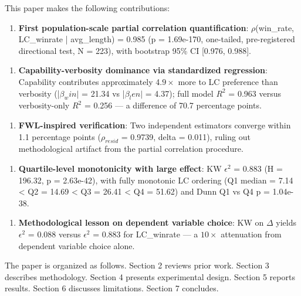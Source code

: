 This paper makes the following contributions:

\begin{enumerate}
\item \textbf{First population-scale partial correlation quantification}: $\rho$(win\_rate, LC\_winrate | avg\_length) = 0.985 (p = 1.69e-170, one-tailed, pre-registered directional test, N = 223), with bootstrap 95\% CI [0.976, 0.988].
\end{enumerate}

\begin{enumerate}
\item \textbf{Capability-verbosity dominance via standardized regression}: Capability contributes approximately 4.$9\times$ more to LC preference than verbosity (|$\beta _win|$ = 21.34 vs |$\beta _len|$ = 4.37); full model $R^2$ = 0.963 versus verbosity-only $R^2$ = 0.256 --- a difference of 70.7 percentage points.
\end{enumerate}

\begin{enumerate}
\item \textbf{FWL-inspired verification}: Two independent estimators converge within 1.1 percentage points ($\rho_{resid}$ = 0.9739, delta = 0.011), ruling out methodological artifact from the partial correlation procedure.
\end{enumerate}

\begin{enumerate}
\item \textbf{Quartile-level monotonicity with large effect}: KW $\epsilon ^2$ = 0.883 (H = 196.32, p = 2.63e-42), with fully monotonic LC ordering (Q1 median = 7.14 < Q2 = 14.69 < Q3 = 26.41 < Q4 = 51.62) and Dunn Q1 vs Q4 p = 1.04e-38.
\end{enumerate}

\begin{enumerate}
\item \textbf{Methodological lesson on dependent variable choice}: KW on $\Delta$ yields $\epsilon ^2$ = 0.088 versus $\epsilon ^2$ = 0.883 for LC\_winrate --- a $10\times$ attenuation from dependent variable choice alone.
\end{enumerate}

The paper is organized as follows. Section 2 reviews prior work. Section 3 describes methodology. Section 4 presents experimental design. Section 5 reports results. Section 6 discusses limitations. Section 7 concludes.

